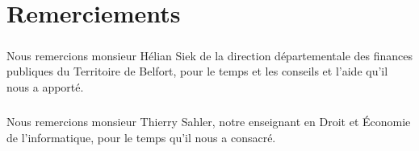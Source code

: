 \chapter*{Remerciements}

\paragraph{}
    Nous remercions monsieur Hélian Siek de la direction départementale des finances publiques du Territoire de Belfort, pour le temps et les conseils et l'aide qu'il nous a apporté.

\paragraph{}
    Nous remercions monsieur Thierry Sahler, notre enseignant en Droit et Économie de l'informatique, pour le temps qu'il nous a consacré.
